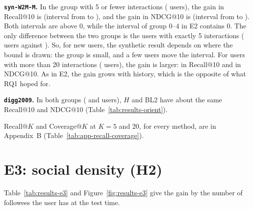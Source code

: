\textbf{\texttt{syn-W2M-M}.} In the group with 5 or fewer interactions (\orientWTwoMZeroFiveN{} users), the gain in Recall@10 is \orientWTwoMRecallTenZeroFiveGain{} (interval from \orientWTwoMRecallTenZeroFiveCiLow{} to \orientWTwoMRecallTenZeroFiveCiHigh{}), and the gain in NDCG@10 is \orientWTwoMNdcgTenZeroFiveGain{} (interval from \orientWTwoMNdcgTenZeroFiveCiLow{} to \orientWTwoMNdcgTenZeroFiveCiHigh{}). Both intervals are above 0, while the interval of group 0--4 in E2 contains 0. The only difference between the two groups is the users with exactly 5 interactions (\orientWTwoMZeroFiveN{} users against \eTwoWTwoMNdcgTenZeroFourN{}). So, for new users, the synthetic result depends on where the bound is drawn: the group is small, and a few users move the interval. For users with more than 20 interactions (\orientWTwoMTwentyOnePlusN{} users), the gain is larger: \orientWTwoMRecallTenTwentyOnePlusGain{} in Recall@10 and \orientWTwoMNdcgTenTwentyOnePlusGain{} in NDCG@10. As in E2, the gain grows with history, which is the opposite of what RQ1 hoped for.

\textbf{\texttt{digg2009}.} In both groups (\orientDiggZeroFiveN{} and \orientDiggTwentyOnePlusN{} users), $H$ and BL2 have about the same Recall@10 and NDCG@10 (Table~\ref{tab:results-orient}).

Recall@$K$ and Coverage@$K$ at $K = 5$ and 20, for every method, are in Appendix~B (Table~\ref{tab:app-recall-coverage}).

\section{E3: social density (H2)}
\label{sec:results-e3}

Table~\ref{tab:results-e3} and Figure~\ref{fig:results-e3} give the gain by the number of followees the user has at the test time.

\begin{table}[htbp]
  \centering
  \caption{E3: gain of $H$ over BL2 by social density (the number of followees at the test time), NDCG@10.}
  \label{tab:results-e3}
  \small
  
\end{table}

